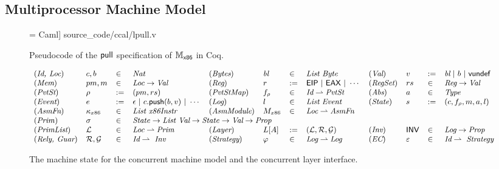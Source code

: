\subsection{Multiprocessor Machine Model}
\label{boot-total}

\begin{figure}[t]
 = Caml] {source_code/ccal/lpull.v}
\caption{Pseudocode of the $\mathsf{pull}$ specification of $\mathbb{M}_{\mathsf{x86}}$  in Coq.}
\label{fig:exp:lpull}
\end{figure}

\begin{figure*}
\begin{center}
$
{\small
\begin{array}{llllllllllll}
(\textit{Id, Loc}) & c, b & \in &\textit{Nat}
& 
(\textit{Bytes})  &\bytelist & \in & \textit{List Byte}
&
(\textit{Val}) & v & := & \bytelist \ | \ b \ |\ \vundef
\\
 (\textit{Mem}) & pm, m & \in & \textit{Loc} \rightarrow  \textit{Val} 
&
(\textit{Reg})  &r & := & \mathsf{EIP} \ | \ \mathsf{EAX} \ | \  \cdots
& 
(\textit{RegSet}) & \regset & \in & \textit{Reg} \rightarrow \textit{Val}  
\\
(\textit{PvtSt}) & \regs & := & (pm, rs)
& 
(\textit{PvtStMap}) & f_\regs &\in & \textit{Id} \alist \textit{PvtSt}  
&
(\textit{Abs}) & a & \in & \textit{Type}  
\\ 
(\textit{Event}) & e & := & \emptye \ | \ c.\push(b,v)
\ |\  \cdots
&
(\textit{Log}) & l & \in & \textit{List}\ \textit{Event}
& 
(\textit{State}) & s & := & (c, f_\regs,m,a,l)
\\
(\textit{AsmFn}) & \kappa_{x86} & \in &  \textit{List x86Instr}  
&
(\textit{AsmModule}) & M_{x86} & \in & \textit{Loc} \partialf  \textit{AsmFn} 
 \\
(\mathit{Prim}) & \spec{} & \in & 
\multicolumn{5}{l}{
\mathit{State} \rightarrow
\textit{List Val} \rightarrow 
\mathit{State}  \rightarrow
\textit{Val} \rightarrow 
\textit{Prop}}
 \\
(\textit{PrimList}) & \Layer & \in & \textit{Loc} \alist \textit{Prim}
&
(\textit{Layer}) & L[A] & := & (\Layer, \Rely, \Guard)
 &
 (\textit{Inv}) & \comm{INV} & \in & \textit{Log} \rightarrow \textit{Prop}
\\
(\textit{Rely, Guar}) & \Rely, \Guard& \in & \textit{Id} \alist\ \textit{Inv}
&
(\textit{Strategy}) & \strat{} & \in & \textit{Log} \alist \textit{Log}
&
(\textit{EC}) & \oracle & \in & \textit{Id} \alist\ \textit{Strategy}
\end{array}
}
$
\end{center}
\caption{The machine state for the concurrent machine model and the concurrent layer interface.}
\label{fig:mach:syntax}
\end{figure*}

